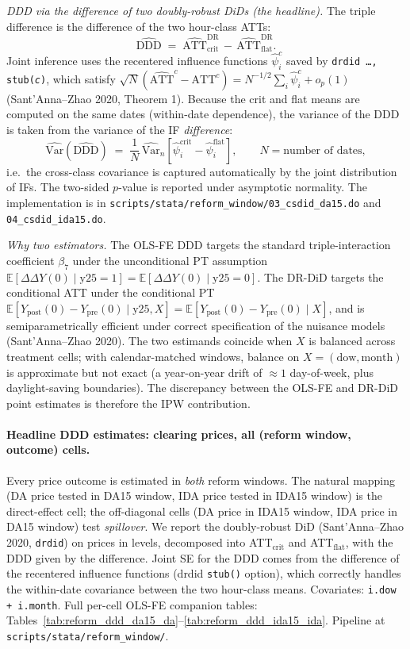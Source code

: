 \documentclass[11pt,a4paper]{article}
\newcommand{\code}[1]{\nolinkurl{#1}}
\begin{document}
\textit{DDD via the difference of two doubly-robust DiDs (the headline).} The triple difference is the difference of the two hour-class ATTs:
\[
\widehat{\text{DDD}} \;=\; \widehat{\text{ATT}}^{\text{DR}}_{\text{crit}} \,-\, \widehat{\text{ATT}}^{\text{DR}}_{\text{flat}}.
\]
Joint inference uses the recentered influence functions $\hat\psi^{c}_i$ saved by \texttt{drdid \ldots, stub(\textit{c})}, which satisfy $\sqrt N(\widehat{\text{ATT}}^{c} - \text{ATT}^{c}) = N^{-1/2}\sum_i \hat\psi^{c}_i + o_p(1)$ (Sant'Anna--Zhao 2020, Theorem 1). Because the crit and flat means are computed on the same dates (within-date dependence), the variance of the DDD is taken from the variance of the IF \emph{difference}:
\[
\widehat{\text{Var}}(\widehat{\text{DDD}}) \;=\; \frac{1}{N}\,\widehat{\text{Var}}_n\!\left[\hat\psi^{\text{crit}}_i - \hat\psi^{\text{flat}}_i\right], \qquad N = \text{number of dates},
\]
i.e.\ the cross-class covariance is captured automatically by the joint distribution of IFs. The two-sided $p$-value is reported under asymptotic normality. The implementation is in \code{scripts/stata/reform_window/03_csdid_da15.do} and \code{04_csdid_ida15.do}.

\textit{Why two estimators.} The OLS-FE DDD targets the standard triple-interaction coefficient $\beta_7$ under the unconditional PT assumption $\mathbb{E}[\Delta\Delta Y(0) \mid \text{y25}=1] = \mathbb{E}[\Delta\Delta Y(0) \mid \text{y25}=0]$. The DR-DiD targets the conditional ATT under the conditional PT $\mathbb{E}[Y_{\text{post}}(0) - Y_{\text{pre}}(0) \mid \text{y25}, X] = \mathbb{E}[Y_{\text{post}}(0) - Y_{\text{pre}}(0) \mid X]$, and is semiparametrically efficient under correct specification of the nuisance models (Sant'Anna--Zhao 2020). The two estimands coincide when $X$ is balanced across treatment cells; with calendar-matched windows, balance on $X = (\text{dow}, \text{month})$ is approximate but not exact (a year-on-year drift of $\approx 1$ day-of-week, plus daylight-saving boundaries). The discrepancy between the OLS-FE and DR-DiD point estimates is therefore the IPW contribution.

\paragraph{Headline DDD estimates: clearing prices, all (reform window, outcome) cells.}
Every price outcome is estimated in \emph{both} reform windows. The natural mapping (DA price tested in DA15 window, IDA price tested in IDA15 window) is the direct-effect cell; the off-diagonal cells (DA price in IDA15 window, IDA price in DA15 window) test \emph{spillover}. We report the doubly-robust DiD (Sant'Anna--Zhao 2020, \texttt{drdid}) on prices in levels, decomposed into ATT$_{\text{crit}}$ and ATT$_{\text{flat}}$, with the DDD given by the difference. Joint SE for the DDD comes from the difference of the recentered influence functions (drdid \texttt{stub()} option), which correctly handles the within-date covariance between the two hour-class means. Covariates: \texttt{i.dow + i.month}. Full per-cell OLS-FE companion tables: Tables~\ref{tab:reform_ddd_da15_da}--\ref{tab:reform_ddd_ida15_ida}. Pipeline at \code{scripts/stata/reform_window/}.
\end{document}
